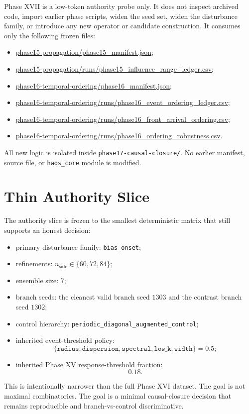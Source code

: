 \documentclass[11pt]{article}
\begin{document}
Phase XVII is a low-token authority probe only. It does not inspect archived code, import earlier phase scripts, widen the seed set, widen the disturbance family, or introduce any new operator or candidate construction. It consumes only the following frozen files:
\begin{itemize}
\item \url{phase15-propagation/phase15_manifest.json};
\item \url{phase15-propagation/runs/phase15_influence_range_ledger.csv};
\item \url{phase16-temporal-ordering/phase16_manifest.json};
\item \url{phase16-temporal-ordering/runs/phase16_event_ordering_ledger.csv};
\item \url{phase16-temporal-ordering/runs/phase16_front_arrival_ordering.csv};
\item \url{phase16-temporal-ordering/runs/phase16_ordering_robustness.csv}.
\end{itemize}

All new logic is isolated inside \texttt{phase17-causal-closure/}. No earlier manifest, source file, or \texttt{haos\_core} module is modified.

\section{Thin Authority Slice}

The authority slice is frozen to the smallest deterministic matrix that still supports an honest decision:
\begin{itemize}
\item primary disturbance family: \texttt{bias\_onset};
\item refinements: $n_{\mathrm{side}} \in \{60,72,84\}$;
\item ensemble size: $7$;
\item branch seeds: the cleanest valid branch seed $1303$ and the contrast branch seed $1302$;
\item control hierarchy: \texttt{periodic\_diagonal\_augmented\_control};
\item inherited event-threshold policy:
\[
\{\texttt{radius},\texttt{dispersion},\texttt{spectral},\texttt{low\_k},\texttt{width}\}=0.5;
\]
\item inherited Phase XV response-threshold fraction:
\[
0.18.
\]
\end{itemize}

This is intentionally narrower than the full Phase XVI dataset. The goal is not maximal combinatorics. The goal is a minimal causal-closure decision that remains reproducible and branch-vs-control discriminative.
\end{document}
